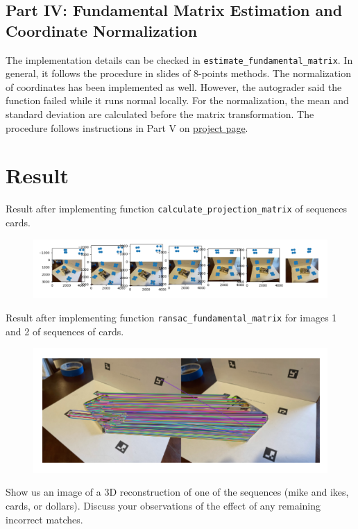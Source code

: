 \subsection*{Part IV: Fundamental Matrix Estimation and Coordinate Normalization}
The implementation details can be checked in \texttt{estimate\_fundamental\_matrix}. In general, it follows the procedure in slides of 8-points methods. The normalization of coordinates has been implemented as well. However, the autograder said the function failed while it runs normal locally. For the normalization, the mean and standard deviation are calculated before the matrix transformation. The procedure follows instructions in Part V on \href{https://browncsci1430.github.io/webpage/proj5_cameras/}{project page}.

\section*{Result}
Result after implementing function \texttt{calculate\_projection\_matrix} of sequences cards.

\begin{figure}[htbp]
    \centering
    \includegraphics[width=\linewidth]{calculate_projection_matrix.png}
\end{figure}

Result after implementing function \texttt{ransac\_fundamental\_matrix} for images 1 and 2 of sequences of cards.

\begin{figure}[htbp]
    \centering
    \includegraphics[width=0.8\linewidth]{ransac.png}
\end{figure}

Show us an image of a 3D reconstruction of one of the sequences (mike and ikes, cards, or dollars). Discuss your observations of the effect of any remaining incorrect matches.

